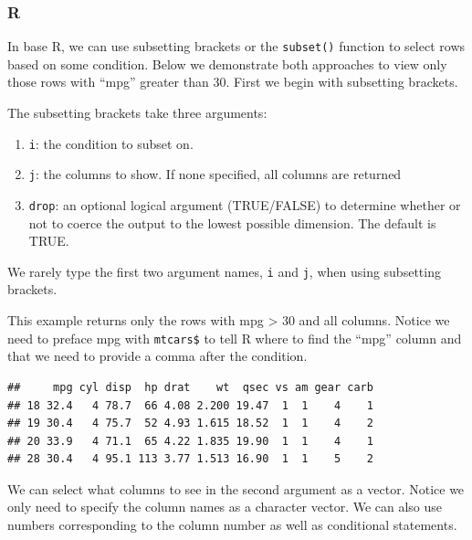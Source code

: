 \documentclass[
]{book}
\newenvironment{Shaded}{\begin{snugshade}}{\end{snugshade}}
\newcommand{\DecValTok}[1]{\textcolor[rgb]{0.00,0.00,0.81}{#1}}
\newcommand{\NormalTok}[1]{#1}
\newcommand{\SpecialCharTok}[1]{\textcolor[rgb]{0.00,0.00,0.00}{#1}}
\providecommand{\tightlist}{%
  \setlength{\itemsep}{0pt}\setlength{\parskip}{0pt}}
\begin{document}
\hypertarget{r-19}{%
\subsubsection*{R}\label{r-19}}

In base R, we can use subsetting brackets or the \texttt{subset()} function to select rows based on some condition. Below we demonstrate both approaches to view only those rows with ``mpg'' greater than 30. First we begin with subsetting brackets.

The subsetting brackets take three arguments:

\begin{enumerate}
\def\labelenumi{\arabic{enumi}.}
\tightlist
\item
  \texttt{i}: the condition to subset on.
\item
  \texttt{j}: the columns to show. If none specified, all columns are returned
\item
  \texttt{drop}: an optional logical argument (TRUE/FALSE) to determine whether or not to coerce the output to the lowest possible dimension. The default is TRUE.
\end{enumerate}

We rarely type the first two argument names, \texttt{i} and \texttt{j}, when using subsetting brackets.

This example returns only the rows with mpg \textgreater{} 30 and all columns. Notice we need to preface mpg with \texttt{mtcars\$} to tell R where to find the ``mpg'' column and that we need to provide a comma after the condition.

\begin{Shaded}
\end{Shaded}

\begin{verbatim}
##     mpg cyl disp  hp drat    wt  qsec vs am gear carb
## 18 32.4   4 78.7  66 4.08 2.200 19.47  1  1    4    1
## 19 30.4   4 75.7  52 4.93 1.615 18.52  1  1    4    2
## 20 33.9   4 71.1  65 4.22 1.835 19.90  1  1    4    1
## 28 30.4   4 95.1 113 3.77 1.513 16.90  1  1    5    2
\end{verbatim}

We can select what columns to see in the second argument as a vector. Notice we only need to specify the column names as a character vector. We can also use numbers corresponding to the column number as well as conditional statements.
\end{document}
